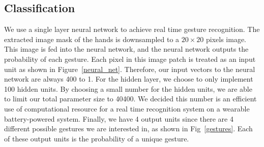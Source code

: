 \subsection{Classification}
We use a single layer neural network to achieve real time gesture recognition.
The extracted image mask of the hands is downsampled to a $20\times20$
pixels image. This image is fed into the neural network, and the neural
network outputs the probability of each gesture. Each pixel in this image
patch is treated as an input unit as shown in Figure~\ref{neural_net}.
Therefore, our input vectors to the neural network are always 400 to 1.
For the hidden layer, we choose to only implement 100 hidden units.
By choosing a small number for the hidden units, we are able to limit our
total parameter size to 40400. We decided this number is an efficient use of
computational resource for a real time recognition system on a wearable
battery-powered system. Finally, we have 4 output units since there are 4
different possible gestures we are interested in, as shown in
Fig~\protect\ref{gestures}. Each of these output units is the probability of
a unique gesture.
